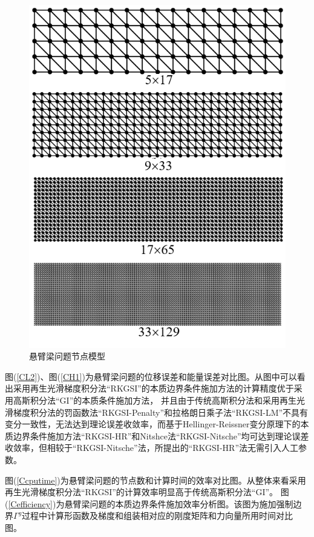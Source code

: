 \begin{figure}[H]
    \centering
    \includegraphics[scale=0.7]{figure/EHR/cantilever/cantilever.mesh.png}
    \caption{悬臂梁问题节点模型}\label{cantilever.mesh}
\end{figure}
图(\ref{CL2})、图(\ref{CH1})为悬臂梁问题的位移误差和能量误差对比图。从图中可以看出采用再生光滑梯度积分法“RKGSI”的本质边界条件施加方法的计算精度优于采用高斯积分法“GI”的本质条件施加方法，
并且由于传统高斯积分法和采用再生光滑梯度积分法的罚函数法“RKGSI-Penalty”和拉格朗日乘子法“RKGSI-LM”不具有变分一致性，无法达到理论误差收敛率，而基于Hellinger-Reissner变分原理下的本质边界条件施加方法“RKGSI-HR”和Nitshce法“RKGSI-Nitsche”均可达到理论误差收敛率，但相较于“RKGSI-Nitsche”法，所提出的“RKGSI-HR”法无需引入人工参数。
\par
图(\ref{Ccputime})为悬臂梁问题的节点数和计算时间的效率对比图。从整体来看采用再生光滑梯度积分法“RKGSI”的计算效率明显高于传统高斯积分法“GI”。
图(\ref{Cefficiency})为悬臂梁问题的本质边界条件施加效率分析图。该图为施加强制边界$\Gamma^g$过程中计算形函数及梯度和组装相对应的刚度矩阵和力向量所用时间对比图。
